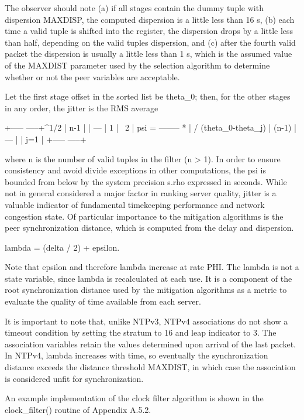    The observer should note (a) if all stages contain the dummy tuple
   with dispersion MAXDISP, the computed dispersion is a little less
   than 16 s, (b) each time a valid tuple is shifted into the register,
   the dispersion drops by a little less than half, depending on the
   valid tuples dispersion, and (c) after the fourth valid packet the
   dispersion is usually a little less than 1 s, which is the assumed
   value of the MAXDIST parameter used by the selection algorithm to
   determine whether or not the peer variables are acceptable.

   Let the first stage offset in the sorted list be theta_0; then, for
   the other stages in any order, the jitter is the RMS average

                          +-----                 -----+^1/2
                          |  n-1                      |
                          |  ---                      |
                  1       |  \                     2  |
      psi   =  -------- * |  /    (theta_0-theta_j)   |
                (n-1)     |  ---                      |
                          |  j=1                      |
                          +-----                 -----+

   where n is the number of valid tuples in the filter (n > 1).  In
   order to ensure consistency and avoid divide exceptions in other
 computations, the psi is bounded from below by the system precision
   s.rho expressed in seconds.  While not in general considered a major
   factor in ranking server quality, jitter is a valuable indicator of
   fundamental timekeeping performance and network congestion state.  Of
   particular importance to the mitigation algorithms is the peer
   synchronization distance, which is computed from the delay and
   dispersion.

   lambda = (delta / 2) + epsilon.

   Note that epsilon and therefore lambda increase at rate PHI.  The
   lambda is not a state variable, since lambda is recalculated at each
   use.  It is a component of the root synchronization distance used by
   the mitigation algorithms as a metric to evaluate the quality of time
   available from each server.

   It is important to note that, unlike NTPv3, NTPv4 associations do not
   show a timeout condition by setting the stratum to 16 and leap
   indicator to 3.  The association variables retain the values
   determined upon arrival of the last packet.  In NTPv4, lambda
   increases with time, so eventually the synchronization distance
   exceeds the distance threshold MAXDIST, in which case the association
   is considered unfit for synchronization.

   An example implementation of the clock filter algorithm is shown in
   the clock_filter() routine of Appendix A.5.2.
